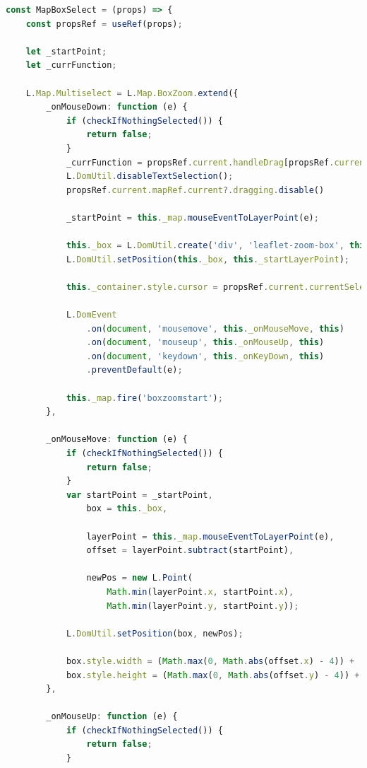 \begin{lstlisting}[language=Typescript, caption={Multiselect Tool},label={lst:multiselect-tool}]
const MapBoxSelect = (props) => {
    const propsRef = useRef(props);

    let _startPoint;
    let _currFunction;

    L.Map.Multiselect = L.Map.BoxZoom.extend({
        _onMouseDown: function (e) {
            if (checkIfNothingSelected()) {
                return false;
            }
            _currFunction = propsRef.current.handleDrag[propsRef.current.currentSelectedTool.id]
            L.DomUtil.disableTextSelection();
            propsRef.current.mapRef.current?.dragging.disable()

            _startPoint = this._map.mouseEventToLayerPoint(e);

            this._box = L.DomUtil.create('div', 'leaflet-zoom-box', this._pane);
            L.DomUtil.setPosition(this._box, this._startLayerPoint);

            this._container.style.cursor = propsRef.current.currentSelectedTool;

            L.DomEvent
                .on(document, 'mousemove', this._onMouseMove, this)
                .on(document, 'mouseup', this._onMouseUp, this)
                .on(document, 'keydown', this._onKeyDown, this)
                .preventDefault(e);

            this._map.fire('boxzoomstart');
        },

        _onMouseMove: function (e) {
            if (checkIfNothingSelected()) {
                return false;
            }
            var startPoint = _startPoint,
                box = this._box,

                layerPoint = this._map.mouseEventToLayerPoint(e),
                offset = layerPoint.subtract(startPoint),

                newPos = new L.Point(
                    Math.min(layerPoint.x, startPoint.x),
                    Math.min(layerPoint.y, startPoint.y));

            L.DomUtil.setPosition(box, newPos);

            box.style.width = (Math.max(0, Math.abs(offset.x) - 4)) + 'px';
            box.style.height = (Math.max(0, Math.abs(offset.y) - 4)) + 'px';
        },

        _onMouseUp: function (e) {
            if (checkIfNothingSelected()) {
                return false;
            }


\end{lstlisting}
